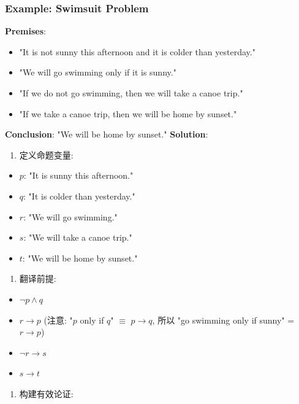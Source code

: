 \documentclass[10pt,a4paper,openany]{ctexbook}
\theoremstyle{definition}
\theoremstyle{remark}
\begin{document}
\subsubsection{Example: Swimsuit Problem}

\textbf{Premises}:
\begin{itemize}
\item "It is not sunny this afternoon and it is colder than yesterday."
\item "We will go swimming only if it is sunny."
\item "If we do not go swimming, then we will take a canoe trip."
\item "If we take a canoe trip, then we will be home by sunset."

\end{itemize}

\textbf{Conclusion}: "We will be home by sunset."
\textbf{Solution}:
\begin{enumerate}
\item 定义命题变量:
\end{enumerate}

\begin{itemize}
\item $p$: "It is sunny this afternoon."
\item $q$: "It is colder than yesterday."
\item $r$: "We will go swimming."
\item $s$: "We will take a canoe trip."
\item $t$: "We will be home by sunset."

\end{itemize}

\begin{enumerate}
\item 翻译前提:
\end{enumerate}

\begin{itemize}
\item $\neg p \land q$
\item $r \to p$ (注意: "$p$ only if $q$" $\equiv$ $p \to q$, 所以 "go swimming only if sunny" = $r \to p$)
\item $\neg r \to s$
\item $s \to t$

\end{itemize}

\begin{enumerate}
\item 构建有效论证:

\end{enumerate}
\end{document}
